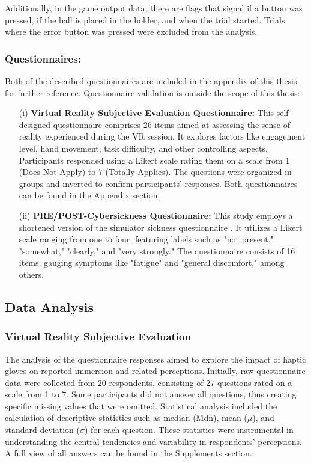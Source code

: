 \documentclass[12pt,oneside,openright]{report}
\begin{document}
Additionally, in the game output data, there are flags that signal if a button was pressed, if the ball is placed in the holder, and when the trial started. Trials where the error button was pressed were excluded from the analysis.

\subsubsection*{Questionnaires:}
Both of the described questionnaires are included in the appendix of this thesis for further reference. Questionnaire validation is outside the scope of this thesis:

\begin{enumerate}
\item[(i)] \textbf{Virtual Reality Subjective Evaluation Questionnaire:} This self-designed questionnaire comprises 26 items aimed at assessing the sense of reality experienced during the VR session. It explores factors like engagement level, hand movement, task difficulty, and other controlling aspects. Participants responded using a Likert scale rating them on a scale from 1 (Does Not Apply) to 7 (Totally Applies). The questions were organized in groups and inverted to confirm participants' responses. Both questionnaires can be found in the Appendix section.

\item[(ii)] \textbf{PRE/POST-Cybersickness Questionnaire:} This study employs a shortened version of the simulator sickness questionnaire \parencite{avpsy}. It utilizes a Likert scale ranging from one to four, featuring labels such as "not present," "somewhat," "clearly," and "very strongly." The questionnaire consists of 16 items, gauging symptoms like "fatigue" and "general discomfort," among others.
\end{enumerate}

\subsection*{Data Analysis}

\subsubsection*{Virtual Reality Subjective Evaluation}
The analysis of the questionnaire responses aimed to explore the impact of haptic gloves on reported immersion and related perceptions. Initially, raw questionnaire data were collected from 20 respondents, consisting of 27 questions rated on a scale from 1 to 7. Some participants did not answer all questions, thus creating specific missing values that were omitted. Statistical analysis included the calculation of descriptive statistics such as median ($\text{Mdn}$), mean ($\mu$), and standard deviation ($\sigma$) for each question. These statistics were instrumental in understanding the central tendencies and variability in respondents' perceptions. A full view of all answers can be found in the Supplements section.
\end{document}
